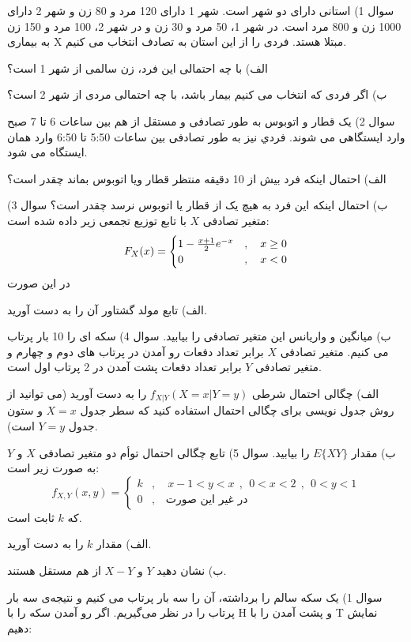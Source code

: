 \documentclass[10pt,letterpaper]{article}
\begin{document}
سوال 1) استانی دارای دو شهر است. شهر 1 دارای 120 مرد و 80 زن و شهر 2 دارای 1000 زن و 800 مرد است. در شهر 1،  50 مرد و 30 زن و در شهر 2، 100 مرد و 150 زن به بیماری X مبتلا هستد. فردی را از این استان به تصادف انتخاب می کنیم.

الف) با چه احتمالی این فرد، زن سالمی از شهر 1 است؟

ب) اگر فردی که انتخاب می کنیم بیمار باشد، با چه احتمالی مردی از شهر 2 است؟

\newpage
سوال 2) یک قطار و اتوبوس به طور تصادفی و مستقل از هم بین ساعات 6 تا 7 صبح وارد ایستگاهی می شوند. فردي نیز به طور تصادفی بین ساعات 5:50 تا 6:50 وارد همان ایستگاه می شود.

الف) احتمال اینکه فرد بیش از 10 دقیقه منتظر قطار ویا اتوبوس بماند چقدر است؟

ب) احتمال اینکه این فرد به هیچ یک از قطار یا اتوبوس نرسد چقدر است؟
\newpage
سوال 3) متغیر تصادفی $X$ با تابع توزیع تجمعی زیر داده شده است:
$$
F_X(x)=\begin{cases}
1-{x+1\over 2}e^{-x}&,\quad x\ge 0
\\0&,\quad x<0
\end{cases}
$$
در این صورت

الف) تابع مولد گشتاور آن را به دست آورید.

ب) میانگین و واریانس این متغیر تصادفی را بیابید.
\newpage
سوال 4) سکه ای را 10 بار پرتاب می کنیم. متغیر تصادفی $X$ برابر تعداد دفعات رو آمدن در پرتاب های دوم و چهارم و متغیر تصادفی $Y$ برابر تعداد دفعات پشت آمدن در 2 پرتاب اول است.

الف) چگالی احتمال شرطی
$
f_{X|Y}(X=x|Y=y)
$
 را به دست آورید (می توانید از روش جدول نویسی برای چگالی احتمال استفاده کنید که سطر جدول $X=x$ و ستون جدول $Y=y$ است).

ب) مقدار 
$
E\{XY\}
$
 را بیابید.
\newpage
سوال 5) تابع چگالی احتمال توأم دو متغیر تصادفی $X$ و $Y$ به صورت زیر است:
$$
f_{X,Y}(x,y)=\begin{cases}
k&,\quad x-1<y<x\ \ ,\ \ 0<x<2\ \ ,\ \ 0<y<1
\\0&,\quad \text{در غیر این صورت}
\end{cases}
$$
که $k$ ثابت است.

الف) مقدار $k$ را به دست آورید.

ب) نشان دهید $Y$ و $X-Y$ از هم مستقل هستند.

سوال 1) یک سکه سالم را برداشته، آن را سه بار پرتاب می کنیم و نتیجه‌ی سه بار پرتاب را در نظر می‌گیریم. اگر رو آمدن سکه را با H و پشت آمدن را با T نمایش دهیم:
\end{document}
